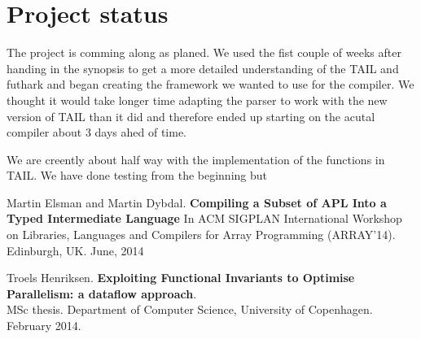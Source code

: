 \documentclass[11pt]{article}
\begin{document}
\section{Project status}
The project is comming along as planed. We used the fist couple of weeks after handing in the synopsis to get a more detailed understanding of the TAIL and futhark and began creating the framework we wanted to use for the compiler. 
We thought it would take longer time adapting the parser to work with the new version of TAIL than it did and therefore ended up starting on the acutal compiler about 3 days ahed of time. 

We are creently about half way with the implementation of the functions in TAIL. We have done testing from the beginning but 


\begin{thebibliography}{widest entry}

   Martin Elsman and Martin Dybdal. \textbf{Compiling a Subset of APL Into a Typed Intermediate Language} In ACM SIGPLAN International Workshop on Libraries, Languages and Compilers for Array Programming (ARRAY’14). Edinburgh, UK. June, 2014

   Troels Henriksen. \textbf{Exploiting Functional Invariants to Optimise Parallelism: a dataflow approach}.\\   MSc thesis. Department of Computer Science, University of Copenhagen. February 2014.
  

\end{thebibliography}
\end{document}
